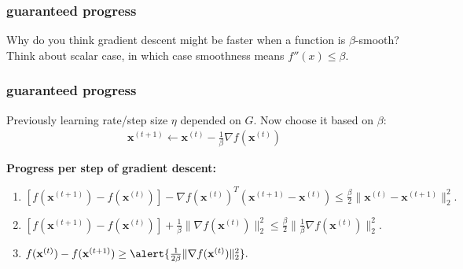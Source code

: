 \documentclass[compress]{beamer}
\newcommand{\bv}[1]{\mathbf{#1}}
\begin{document}
\begin{frame}[t]
	\frametitle{guaranteed progress}
	\begin{center}
	Why do you think gradient descent might be faster when a function is $\beta$-smooth? Think about scalar case, in which case smoothness means $f''(x) \leq \beta$. 
	\end{center}
\end{frame}

\begin{frame}[t]
	\frametitle{guaranteed progress}
	Previously learning rate/step size $\eta$ depended on $G$. Now choose it based on $\beta$:
	\begin{align*}
		\bv{x}^{(t+1)} \leftarrow \bv{x}^{(t)} - \frac{1}{\beta}\nabla f(\bv{x}^{(t)})
	\end{align*}
	
	\textbf{Progress per step of gradient descent:}
	\begin{enumerate}[1.]
		\item $\left[f(\bv{x}^{(t+1)}) - f(\bv{x}^{(t)})\right] - \nabla f(\bv{x}^{(t)})^T(\bv{x}^{(t+1)} - \bv{x}^{(t)})  \leq \frac{\beta}{2}\|\bv{x}^{(t)} - \bv{x}^{(t+1)}\|_2^2.$\vspace{1.5em}
		\item $\left[f(\bv{x}^{(t+1)}) - f(\bv{x}^{(t)})\right] + 
		\frac{1}{\beta}\|\nabla f(\bv{x}^{(t)})\|_2^2 \leq \frac{\beta}{2}\|\frac{1}{\beta}\nabla f(\bv{x}^{(t)})\|_2^2.$\vspace{1.5em}
		\item $f(\bv{x}^{(t)}) - f(\bv{x}^{(t+1)}) \geq \alert{\frac{1}{2\beta}\|\nabla f(\bv{x}^{(t)})\|_2^2}.$
	\end{enumerate}
\end{frame}
\end{document}
